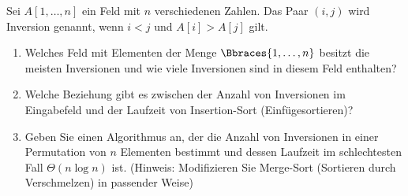 
\begin{exercise}

Sei $A[1, \dots, n]$ ein Feld mit $n$ verschiedenen Zahlen.
Das Paar $(i, j)$ wird Inversion genannt,  wenn $i < j$ und $A[i] > A[j]$ gilt.

\begin{enumerate}[label = (\alph*)]

  \item Welches Feld mit Elementen der Menge $\Bbraces{1, \dots, n}$ besitzt die meisten Inversionen und wie viele Inversionen sind in diesem Feld enthalten?

  \item Welche Beziehung gibt es zwischen der Anzahl von Inversionen im Eingabefeld und der Laufzeit von Insertion-Sort (Einfügesortieren)?

  \item Geben Sie einen Algorithmus an, der die Anzahl von Inversionen in einer Permutation von $n$ Elementen bestimmt und dessen Laufzeit im schlechtesten Fall $\Theta(n \log n)$ ist.
  (Hinweis: Modifizieren Sie Merge-Sort (Sortieren durch Verschmelzen) in passender Weise)

\end{enumerate}

\end{exercise}


